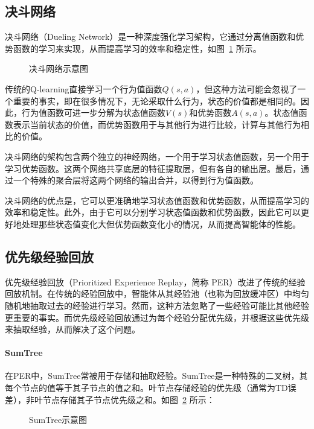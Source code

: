 \subsection{决斗网络}
决斗网络（Dueling Network）是一种深度强化学习架构，它通过分离值函数和优势函数的学习来实现，从而提高学习的效率和稳定性，如图~\ref{fig:duiling_net} 所示。
\begin{figure}[!htb]
    \centering
    
    \caption{\label{fig:duiling_net}决斗网络示意图}
\end{figure}

传统的Q-learning直接学习一个行为值函数$Q(s, a)$，但这种方法可能会忽视了一个重要的事实，即在很多情况下，无论采取什么行为，状态的价值都是相同的。因此，行为值函数可进一步分解为状态值函数$V(s)$和优势函数$A(s, a)$。状态值函数表示当前状态的价值，而优势函数用于与其他行为进行比较，计算与其他行为相比的价值。

决斗网络的架构包含两个独立的神经网络，一个用于学习状态值函数，另一个用于学习优势函数。这两个网络共享底层的特征提取层，但有各自的输出层。最后，通过一个特殊的聚合层将这两个网络的输出合并，以得到行为值函数。

决斗网络的优点是，它可以更准确地学习状态值函数和优势函数，从而提高学习的效率和稳定性。此外，由于它可以分别学习状态值函数和优势函数，因此它可以更好地处理那些状态值变化大但优势函数变化小的情况，从而提高智能体的性能。

\subsection{优先级经验回放}
优先级经验回放（Prioritized Experience Replay，简称 PER）改进了传统的经验回放机制。在传统的经验回放中，智能体从其经验池（也称为回放缓冲区）中均匀随机地抽取过去的经验进行学习。然而，这种方法忽略了一些经验可能比其他经验更重要的事实。而优先级经验回放通过为每个经验分配优先级，并根据这些优先级来抽取经验，从而解决了这个问题。

\paragraph{\textbf{SumTree}}
在PER中，SumTree常被用于存储和抽取经验。SumTree是一种特殊的二叉树，其每个节点的值等于其子节点的值之和。叶节点存储经验的优先级（通常为TD误差），非叶节点存储其子节点优先级之和。如图~\ref{fig:sumtree} 所示：
\begin{figure}[!htb]
    \centering
    
    \caption{\label{fig:sumtree}SumTree示意图}
\end{figure}

